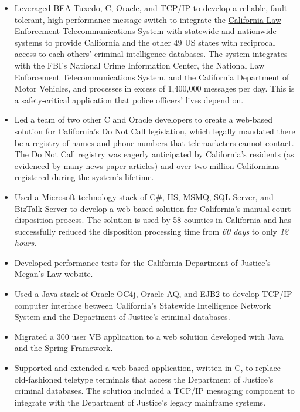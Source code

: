 \documentclass[a4paper,12pt]{article}
\begin{document}
\begin{itemize}

\item Leveraged BEA Tuxedo, C, Oracle, and TCP/IP to develop a reliable, fault tolerant, high performance message switch to integrate the \href{http://definitions.uslegal.com/c/clets/}{California Law Enforcement Telecommunications System} with statewide and nationwide systems to provide California and the other 49 US states with reciprocal access to each others' criminal intelligence databases.  The system integrates with the FBI's National Crime Information Center, the National Law Enforcement Telecommunications System, and the California Department of Motor Vehicles, and processes in excess of 1,400,000 messages per day.  This is a safety-critical application that police officers' lives depend on.

\item Led a team of two other C and Oracle developers to create a web-based solution for California's Do Not Call legislation, which legally mandated there be a registry of names and phone numbers that telemarketers cannot contact.  The Do Not Call registry was eagerly anticipated by California's residents (as evidenced by \href{http://www.sfgate.com/cgi-bin/article.cgi?f=/c/a/2003/03/31/MN5478.DTL}{many news paper articles}) and over two million Californians registered during the system's lifetime.

\item Used a Microsoft technology stack of C\#, IIS, MSMQ, SQL Server, and BizTalk Server to develop a web-based solution for California's manual court disposition process. The solution is used by 58 counties in California and has successfully reduced the disposition processing time from \emph{60 days} to only \emph{12 hours}. 

\item Developed performance tests for the California Department of Justice's \href{http://www.meganslaw.ca.gov/}{Megan's Law} website.

\item Used a Java stack of Oracle OC4j, Oracle AQ, and EJB2 to develop TCP/IP computer interface between California's Statewide Intelligence Network System and the Department of Justice's criminal databases. 

\item Migrated a 300 user VB application to a web solution developed with Java and the Spring Framework. 

\item Supported and extended a web-based application, written in C, to replace old-fashioned teletype terminals that access the Department of Justice's criminal databases.  The solution included a TCP/IP messaging component to integrate with the Department of Justice's legacy mainframe systems.

\end{itemize}
\end{document}
